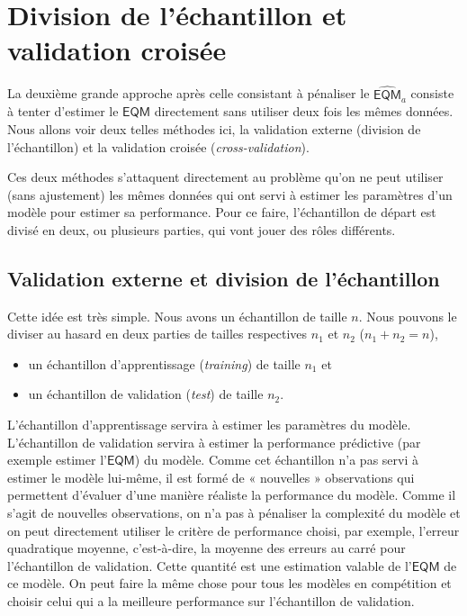 \documentclass[
  11pt,
  letterpaper,
]{book}
\providecommand{\tightlist}{%
  \setlength{\itemsep}{0pt}\setlength{\parskip}{0pt}}
\theoremstyle{definition}
\theoremstyle{definition}
\theoremstyle{definition}
\theoremstyle{remark}
\begin{document}
\hypertarget{division-de-luxe9chantillon-et-validation-croisuxe9e}{%
\section{Division de l'échantillon et validation croisée}\label{division-de-luxe9chantillon-et-validation-croisuxe9e}}

La deuxième grande approche après celle consistant à pénaliser le \(\widehat{\mathsf{EQM}}_a\) consiste à tenter d'estimer le \(\mathsf{EQM}\) directement sans utiliser deux fois les mêmes données. Nous allons voir deux telles méthodes ici, la validation externe (division de l'échantillon) et la validation croisée (\emph{cross-validation}).

Ces deux méthodes s'attaquent directement au problème qu'on ne peut utiliser (sans ajustement) les mêmes données qui ont servi à estimer les paramètres d'un modèle pour estimer sa performance. Pour ce faire, l'échantillon de départ est divisé en deux, ou plusieurs parties, qui vont jouer des rôles différents.

\hypertarget{validation-externe-et-division-de-luxe9chantillon}{%
\subsection{Validation externe et division de l'échantillon}\label{validation-externe-et-division-de-luxe9chantillon}}

Cette idée est très simple. Nous avons un échantillon de taille \(n\). Nous pouvons le diviser au hasard en deux parties de tailles respectives \(n_1\) et \(n_2\) (\(n_1+n_2=n\)),

\begin{itemize}
\tightlist
\item
  un échantillon d'apprentissage (\emph{training}) de taille \(n_1\) et
\item
  un échantillon de validation (\emph{test}) de taille \(n_2\).
\end{itemize}

L'échantillon d'apprentissage servira à estimer les paramètres du modèle. L'échantillon de validation servira à estimer la performance prédictive (par exemple estimer l'\(\mathsf{EQM}\)) du modèle. Comme cet échantillon n'a pas servi à estimer le modèle lui-même, il est formé de « nouvelles » observations qui permettent d'évaluer d'une manière réaliste la performance du modèle. Comme il s'agit de nouvelles observations, on n'a pas à pénaliser la complexité du modèle et on peut directement utiliser le critère de performance choisi, par exemple, l'erreur quadratique moyenne, c'est-à-dire, la moyenne des erreurs au carré pour l'échantillon de validation. Cette quantité est une estimation valable de l'\(\mathsf{EQM}\) de ce modèle. On peut faire la même chose pour tous les modèles en compétition et choisir celui qui a la meilleure performance sur l'échantillon de validation.
\end{document}
